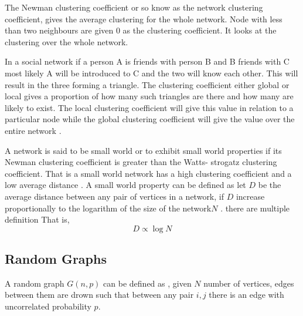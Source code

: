 The Newman clustering coefficient or so know as the network clustering coefficient, gives the average clustering for the whole network. Node with less than two neighbours are given 0 as the clustering coefficient.
It looks at the clustering over the whole network.
 
In a social network if a person A is friends with person B and B friends with C
most likely
A will be introduced to C and the two will know each other. This will result in the three forming a triangle. The clustering coefficient either global or local gives a proportion of how many such triangles are there and how many are likely to exist. The local  clustering coefficient will give this value in relation to a particular node while the global clustering coefficient will give the value over the entire network \citep{estrada2015first}.
 
A network is said to be small world or to exhibit small world properties if its Newman clustering coefficient is greater than the Watts- strogatz clustering coefficient.
That is a small world network has a high clustering coefficient and a low average distance \citep{estrada2012structure}. A small world property can be defined as let $D$ be the average distance between any pair of vertices in a network, if $D$ increase proportionally to the logarithm of the size of the network$N$ \citep{newman1999scaling}.
  there are multiple definition
That is,
 \begin{equation}
 D \propto \log N
\end{equation}

 
\subsection{Random Graphs} 
A random graph $G(n,p)$ can be defined as , given  $N$
number of vertices, edges between them are drown such that between any pair $i,j$ there is an edge with uncorrelated probability $p$. 


